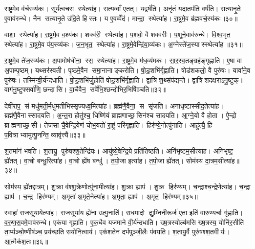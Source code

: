 रा॒ष्ट्रमे॒व व॑र्च॒स्व्य॑कः। सूर्य॑त्वचस॒ स्थेत्या॑ह। स॒त्यव्वाँ ए॒तत्। यद्वर्\mbox{}ष॑ति। अनृ॑तं॒ यदा॒तप॑ति॒ वर्\mbox{}ष॑ति। स॒त्या॒नृ॒ते ए॒वाव॑रुन्धे। नैन सत्यानृ॒ते उ॑दि॒ते हिस्तः। य ए॒वव्वेँद॑। मान्दा॒ स्थेत्या॑ह। रा॒ष्ट्रमे॒व ब्र॑ह्मवर्च॒स्य॑कः॥३०॥

वाशा॒ स्थेत्या॑ह। रा॒ष्ट्रमे॒व व॒श्य॑कः। शक्व॑री॒ स्थेत्या॑ह। प॒शवो॒ वै शक्व॑रीः। प॒शूने॒वाव॑रुन्धे। वि॒श्व॒भृत॒ स्थेत्या॑ह। रा॒ष्ट्रमे॒व प॑य॒स्व्य॑कः। ज॒न॒भृत॒ स्थेत्या॑ह। रा॒ष्ट्रमे॒वेन्द्रि॑या॒व्य॑कः। अ॒ग्नेस्ते॑ज॒स्यास्स्थेत्या॑ह ॥३१॥

रा॒ष्ट्रमे॒व ते॑ज॒स्व्य॑कः। अ॒पामोष॑धीना॒ रस॒ स्थेत्या॑ह। रा॒ष्ट्रमे॒व म॑ध॒व्य॑मकः। सा॒र॒स्व॒तङ्ग्रह॑ङ्गृह्णाति। ए॒षा वा अ॒पाम्पृ॒ष्ठम्। यथ्सर॑स्वती। पृ॒ष्ठमे॒वैन समा॒नानाङ्करोति। षो॒ड॒शभि॑र्गृह्णाति। षोड॑शकलो॒ वै पुरु॑षः। यावा॑ने॒व पुरु॑षः। तस्मि॑न्वी॒र्य॑न्दधाति। षो॒ड॒शभि॑र्जु॒होति॑ षोड॒शभि॑र्गृह्णाति। द्वात्रिश॒थ्संप॑द्यन्ते। द्वात्रिशदक्षराऽनु॒ष्टुक्। वाग॑नु॒ष्टुफ्सर्वा॑णि॒ छन्दासि। वा॒चैवैन॒ सर्वे॑भि॒श्छन्दो॑भिर॒भिषि॑ञ्चति॥३२॥\anuvakamend[ऊ॒र्मिरित्या॑ह॒ सूर्य॑वर्चस॒ स्थेत्या॑ह ब्रह्मवर्च॒स्य॑कस्तेज॒स्यास्स्थेत्या॑है॒व पुरु॑ष॒ष्षट् च॑]

देवी॑राप॒ सं मधु॑मती॒र्मधु॑मतीभिस्सृज्यध्व॒मित्या॑ह। ब्रह्म॑णै॒वैना॒ स सृ॑जति। अना॑धृष्टास्सीद॒तेत्या॑ह। ब्रह्म॑णै॒वैनास्सादयति। अ॒न्त॒रा होतु॑श्च॒ धिष्णि॑यं ब्राह्मणाच्छ॒सिन॑श्च सादयति। आ॒ग्ने॒यो वै होता। ऐ॒न्द्रो ब्राह्मणाच्छ॒सी। तेज॑सा चै॒वेन्द्रि॒येण॑ चोभ॒यतो॑ रा॒ष्ट्रं परि॑गृह्णाति। हिर॑ण्ये॒नोत्पु॑नाति। आहु॑त्यै॒ हि प॒वित्राभ्यामुत्पु॒नन्ति॒ व्यावृ॑त्त्यै॥३३॥

श॒तमा॑नं भवति। श॒तायु॒ पुरु॑षश्श॒तेन्द्रि॑यः। आयु॑ष्ये॒वेन्द्रि॒ये प्रति॑तिष्ठति। अनि॑भृष्टम॒सीत्या॑ह। अनि॑भृष्ट॒ ह्ये॑तत्। वा॒चो बन्धु॒रित्या॑ह। वा॒चो ह्ये॑ष बन्धु॑। त॒पो॒जा इत्या॑ह। त॒पो॒जा ह्ये॑तत्। सोम॑स्य दा॒त्रम॒सीत्या॑ह॥३४॥

सोम॑स्य॒ ह्ये॑तद्दा॒त्रम्। शु॒क्रा व॑श्शु॒क्रेणोत्पु॑ना॒मीत्या॑ह। शु॒क्रा ह्याप॑। शु॒क्र हिर॑ण्यम्। च॒न्द्राश्च॒न्द्रेणेत्या॑ह। च॒न्द्रा ह्याप॑। च॒न्द्र हिर॑ण्यम्। अ॒मृता॑ अ॒मृते॒नेत्या॑ह। अ॒मृता॒ ह्याप॑। अ॒मृत॒ हिर॑ण्यम्॥३५॥

स्वाहा॑ राज॒सूया॒येत्या॑ह। रा॒ज॒सूया॑य॒ ह्ये॑ना उत्पु॒नाति॑। स॒ध॒मादो द्यु॒म्निनी॒रूर्ज॑ ए॒ता इति॑ वारु॒ण्यर्चा गृ॑ह्णाति। व॒रु॒ण॒स॒वमे॒वाव॑रुन्धे। एक॑या गृह्णाति। ए॒क॒धैव यज॑माने वी॒र्य॑न्दधाति। ख्ष॒त्रस्योल्ब॑मसि ख्ष॒त्रस्य॒ योनि॑र॒सीति॑ ता॒र्प्यञ्चो॒ष्णीष॑ञ्च॒ प्रय॑च्छति सयोनि॒त्वाय॑। एक॑शतेन दर्भपुञ्जी॒लैः प॑वयति। श॒तायु॒र्वै पुरु॑षश्श॒तवीर्यः। आ॒त्मैक॑श॒तः॥३६॥

